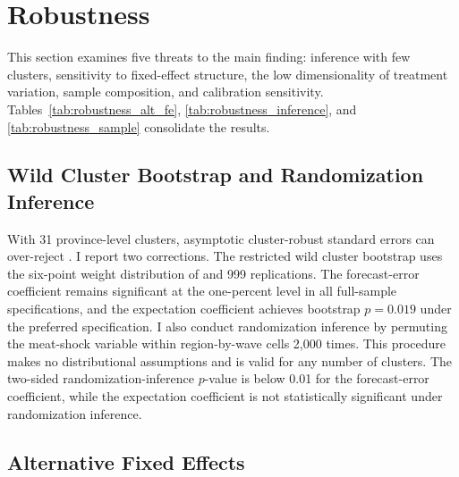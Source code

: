 
\section{Robustness}\label{sec:robustness}

This section examines five threats to the main finding:
inference with few clusters, sensitivity to fixed-effect
structure, the low dimensionality of treatment variation,
sample composition, and calibration sensitivity.
Tables~\ref{tab:robustness_alt_fe},
\ref{tab:robustness_inference}, and
\ref{tab:robustness_sample} consolidate the results.







\subsection{Wild Cluster Bootstrap and Randomization Inference}%
\label{sec:wcb}

With 31 province-level clusters, asymptotic cluster-robust
standard errors can over-reject \citep{Cameron2008}.
I report two corrections.
The restricted wild cluster bootstrap uses the six-point
weight distribution of \citet{Webb2023} and 999
replications.
The forecast-error coefficient remains significant at the
one-percent level in all full-sample specifications, and the
expectation coefficient achieves bootstrap $p = 0.019$ under
the preferred specification.
I also conduct randomization inference by permuting the
meat-shock variable within region-by-wave cells 2,000 times.
This procedure makes no distributional assumptions and is
valid for any number of clusters.
The two-sided randomization-inference $p$-value is below 0.01
for the forecast-error coefficient, while the expectation
coefficient is not statistically significant under randomization
inference.

\subsection{Alternative Fixed Effects}\label{sec:altfe}

